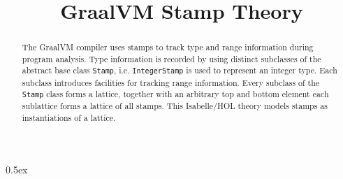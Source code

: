 \documentclass[11pt,a4paper]{article}
\begin{document}
\title{GraalVM Stamp Theory}
\maketitle

\begin{abstract}
The GraalVM compiler uses stamps to track type and range
information during program analysis.
Type information is recorded by using distinct subclasses
of the abstract base class \texttt{Stamp},
i.e. \texttt{IntegerStamp} is used to represent an integer type.
Each subclass introduces facilities for tracking range information.
Every subclass of the \texttt{Stamp} class forms a lattice,
together with an arbitrary top and bottom element each sublattice
forms a lattice of all stamps.
This Isabelle/HOL theory models stamps as instantiations of a lattice.
\end{abstract}

\pagebreak

\tableofcontents

\pagebreak

\parindent 0pt\parskip 0.5ex



%
%
\end{document}
